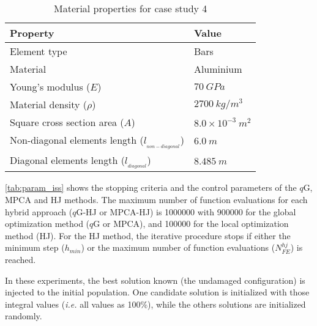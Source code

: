 \begin{table}[H]
\caption{Material properties for case study 4}
\label{tab:iss}
\centering
\footnotesize
\begin{tabular}{ll}
\hline
Property & Value\\
\hline
Element type & Bars \\
Material &  Aluminium\\
Young’s modulus ($E$) & $70~GPa$ \\
Material density ($\rho$) & $2700~kg/m^3$\\
Square cross section area ($A$) & $8.0 \times 10^{-3}~m^2$ \\
Non-diagonal elements length ($l_{_{non-diagonal}}$) & $6.0~m$ \\
Diagonal elements length ($l_{_{diagonal}}$) & $8.485~m$ \\
\hline
\end{tabular}
\end{table}

\autoref{tab:param_iss} shows the stopping criteria and the control parameters of the $q$G, MPCA and HJ methods. The maximum number of function evaluations for each hybrid approach ($q$G-HJ or MPCA-HJ) is 1000000 with 900000 for the global optimization method ($q$G or MPCA), and 100000 for the local optimization method (HJ). For the HJ method, the iterative procedure stops if either the minimum step ($h_{min}$) or the maximum number of function evaluations ($N_{FE}^{hj}$) is reached.

In these experiments, the best solution known (the undamaged configuration) is injected to the initial population. One candidate solution is initialized with those integral values (\textit{i.e.} all values as 100\%), while the others solutions are initialized randomly.

